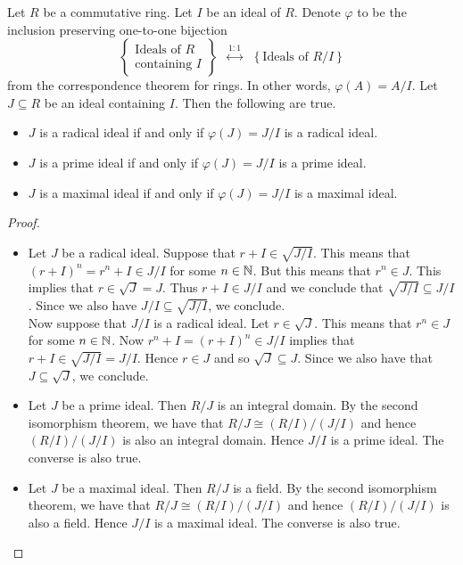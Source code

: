 \documentclass[a4paper]{article}
\begin{document}
\begin{thm}{}{} Let $R$ be a commutative ring. Let $I$ be an ideal of $R$. Denote $\varphi$ to be the inclusion preserving one-to-one bijection $$\left\{\substack{\text{Ideals of }R\\\text{containing }I}\right\}\;\;\overset{1:1}{\longleftrightarrow}\;\;\left\{\text{Ideals of }R/I\right\}$$ from the correspondence theorem for rings. In other words, $\varphi(A)=A/I$. Let $J\subseteq R$ be an ideal containing $I$. Then the following are true. 
\begin{itemize}
\item $J$ is a radical ideal if and only if $\varphi(J)=J/I$ is a radical ideal. 
\item $J$ is a prime ideal if and only if $\varphi(J)=J/I$ is a prime ideal. 
\item $J$ is a maximal ideal if and only if $\varphi(J)=J/I$ is a maximal ideal. 
\end{itemize} 
\begin{proof}~\\
\begin{itemize}
\item Let $J$ be a radical ideal. Suppose that $r+I\in\sqrt{J/I}$. This means that $(r+I)^n=r^n+I\in J/I$ for some $n\in\mathbb{N}$. But this means that $r^n\in J$. This implies that $r\in\sqrt{J}=J$. Thus $r+I\in J/I$ and we conclude that $\sqrt{J/I}\subseteq J/I$. Since we also have $J/I\subseteq\sqrt{J/I}$, we conclude. \\

Now suppose that $J/I$ is a radical ideal. Let $r\in\sqrt{J}$. This means that $r^n\in J$ for some $n\in\mathbb{N}$. Now $r^n+I=(r+I)^n\in J/I$ implies that $r+I\in\sqrt{J/I}=J/I$. Hence $r\in J$ and so $\sqrt{J}\subseteq J$. Since we also have that $J\subseteq\sqrt{J}$, we conclude. 

\item Let $J$ be a prime ideal. Then $R/J$ is an integral domain. By the second isomorphism theorem, we have that $R/J\cong(R/I)/(J/I)$ and hence $(R/I)/(J/I)$ is also an integral domain. Hence $J/I$ is a prime ideal. The converse is also true. 

\item Let $J$ be a maximal ideal. Then $R/J$ is a field. By the second isomorphism theorem, we have that $R/J\cong(R/I)/(J/I)$ and hence $(R/I)/(J/I)$ is also a field. Hence $J/I$ is a maximal ideal. The converse is also true. 
\end{itemize}
\end{proof}
\end{thm}
\end{document}
